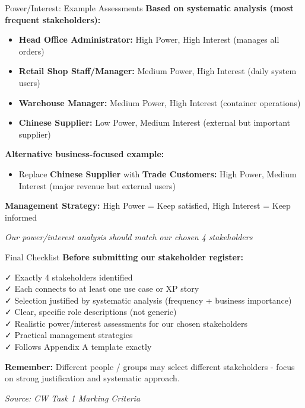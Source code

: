 \documentclass[
  ignorenonframetext,
]{beamer}
\providecommand{\tightlist}{%
  \setlength{\itemsep}{0pt}\setlength{\parskip}{0pt}}
\begin{document}
\begin{frame}{Power/Interest: Example Assessments}
\label{powerinterest-example-assessments}
\textbf{Based on systematic analysis (most frequent stakeholders):}

\begin{itemize}
\tightlist
\item
  \textbf{Head Office Administrator:} High Power, High Interest (manages
  all orders)
\item
  \textbf{Retail Shop Staff/Manager:} Medium Power, High Interest (daily
  system users)
\item
  \textbf{Warehouse Manager:} Medium Power, High Interest (container
  operations)
\item
  \textbf{Chinese Supplier:} Low Power, Medium Interest (external but
  important supplier)
\end{itemize}

\textbf{Alternative business-focused example:}

\begin{itemize}
\tightlist
\item
  Replace \textbf{Chinese Supplier} with \textbf{Trade Customers:} High
  Power, Medium Interest (major revenue but external users)
\end{itemize}

\textbf{Management Strategy:} High Power = Keep satisfied, High Interest
= Keep informed

\emph{Our power/interest analysis should match our chosen 4
stakeholders}
\end{frame}

\begin{frame}{Final Checklist}
\label{final-checklist}
\textbf{Before submitting our stakeholder register:}

✓ Exactly 4 stakeholders identified\\
✓ Each connects to at least one use case or XP story\\
✓ Selection justified by systematic analysis (frequency + business
importance)\\
✓ Clear, specific role descriptions (not generic)\\
✓ Realistic power/interest assessments for our chosen stakeholders\\
✓ Practical management strategies\\
✓ Follows Appendix A template exactly

\textbf{Remember:} Different people / groups may select different
stakeholders - focus on strong justification and systematic approach.

\emph{Source: CW Task 1 Marking Criteria}
\end{frame}
\end{document}
